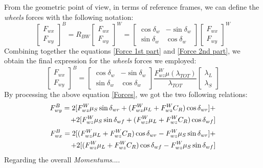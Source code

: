 \documentclass[a4paper,12pt,titlepage]{report}
\begin{document}
		From the geometric point of view, in terms of reference frames, we can define the \textit{wheels} forces with the following notation:
			\begin{equation} \label{Force 2nd part}
				\begin{bmatrix}
					F_{wx} \\
					F_{wy}
				\end{bmatrix}^{B} =	
				R_{BW}
				\begin{bmatrix}
					F_{wx} \\
					F_{wy}
				\end{bmatrix}^{W} =
				\begin{bmatrix}
					\cos\delta_{w} & -\sin\delta_{w} \\
					\sin\delta_{w} & \cos\delta_{w}
				\end{bmatrix}
				\begin{bmatrix}
					F_{wx} \\
					F_{wy}
				\end{bmatrix}^{W}
			\end{equation}
		Combining together the equations \ref{Force 1st part} and \ref{Force 2nd part}, we obtain the final expression for the \textit{wheels} forces we employed:
			\begin{equation} \label{Forces}
				\begin{bmatrix}
					F_{wx} \\
					F_{wy}
				\end{bmatrix}^{B} =	
				\begin{bmatrix}
					\cos\delta_{w} & -\sin\delta_{w} \\
					\sin\delta_{w} & \cos\delta_{w}
				\end{bmatrix}
				\frac{F_{wz}^{W} \mu(\lambda_{TOT})}{\lambda_{TOT}}
				\begin{bmatrix}
					\lambda_{L} \\
					\lambda_{S}
				\end{bmatrix}
			\end{equation}
		By processing the above equation \ref{Forces}, we got the two following relations:
			\begin{equation} \label{F_{wy}}
			\begin{split}
				F_{wy}^{B} = 2 [F_{wz}^{W} \mu_{S}\sin\delta_{wr} + (F_{wz}^{W} \mu_{L} + F_{wz}^{W} C_{R}) \cos\delta_{wr}] + \\ + 2 [F_{wz}^{W} \mu_{S}\sin\delta_{wf} + (F_{wz}^{W} \mu_{L} + F_{wz}^{W} C_{R})\cos\delta_{wf}] 
			\end{split}
			\end{equation}
			\begin{equation} \label{F_{wx}}
			\begin{split}
				F_{wx}^{B} = 2 [(F_{wz}^{W} \mu_{L} + F_{wz}^{W} C_{R})\cos\delta_{wr} - F_{wz}^{W} \mu_{S}\sin\delta_{wr}] + \\ + 2 [(F_{wz}^{W} \mu_{L} + F_{wz}^{W} C_{R})\cos\delta_{wf} - F_{wz}^{W} \mu_{S}\sin\delta_{wf}] 
			\end{split}
			\end{equation}
		Regarding the overall \textit{Momentums}....
		
\end{document}
